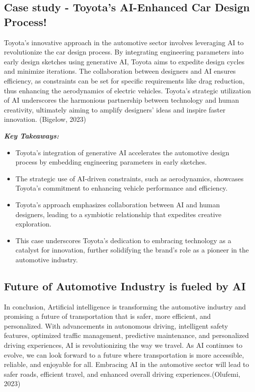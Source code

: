 \documentclass[
]{article}
\begin{document}
\hypertarget{case-study---toyotas-ai-enhanced-car-design-process}{%
\subsection{Case study - Toyota's AI-Enhanced Car Design Process!}\label{case-study---toyotas-ai-enhanced-car-design-process}}

Toyota's innovative approach in the automotive sector involves leveraging AI to revolutionize the car design process. By integrating engineering parameters into early design sketches using generative AI, Toyota aims to expedite design cycles and minimize iterations. The collaboration between designers and AI ensures efficiency, as constraints can be set for specific requirements like drag reduction, thus enhancing the aerodynamics of electric vehicles. Toyota's strategic utilization of AI underscores the harmonious partnership between technology and human creativity, ultimately aiming to amplify designers' ideas and inspire faster innovation. (Bigelow, 2023)

\textbf{\emph{\emph{\textbf{Key Takeaways:}}}}

\begin{itemize}
\item
  Toyota's integration of generative AI accelerates the automotive design process by embedding engineering parameters in early sketches.
\item
  The strategic use of AI-driven constraints, such as aerodynamics, showcases Toyota's commitment to enhancing vehicle performance and efficiency.
\item
  Toyota's approach emphasizes collaboration between AI and human designers, leading to a symbiotic relationship that expedites creative exploration.
\item
  This case underscores Toyota's dedication to embracing technology as a catalyst for innovation, further solidifying the brand's role as a pioneer in the automotive industry.
\end{itemize}

\hypertarget{future-of-automotive-industry-is-fueled-by-ai}{%
\subsection{Future of Automotive Industry is fueled by AI}\label{future-of-automotive-industry-is-fueled-by-ai}}

In conclusion, Artificial intelligence is transforming the automotive industry and promising a future of transportation that is safer, more efficient, and personalized. With advancements in autonomous driving, intelligent safety features, optimized traffic management, predictive maintenance, and personalized driving experiences, AI is revolutionizing the way we travel. As AI continues to evolve, we can look forward to a future where transportation is more accessible, reliable, and enjoyable for all. Embracing AI in the automotive sector will lead to safer roads, efficient travel, and enhanced overall driving experiences.(Olufemi, 2023)
\end{document}
